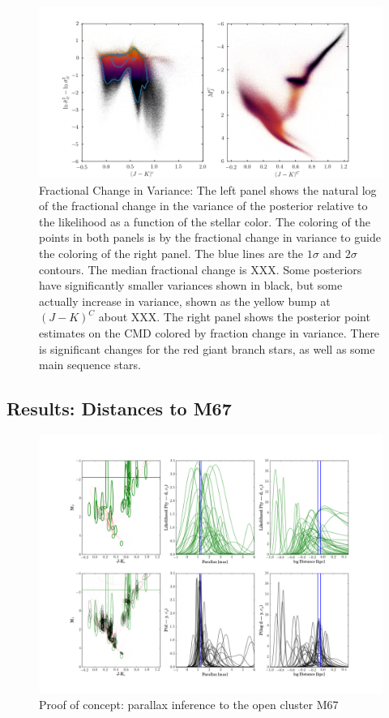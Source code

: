 \documentclass[modern]{aastex61}
\begin{document}
\begin{figure}
\centering
\includegraphics[width=\textwidth]{delta.png}
\caption{Fractional Change in Variance: The left panel shows the natural log of the fractional change in the variance of the posterior relative to the likelihood as a function of the stellar color. The coloring of the points in both panels is by the fractional change in variance to guide the coloring of the right panel. The blue lines are the $1\sigma$ and $2\sigma$ contours. The median fractional change is XXX. Some posteriors have significantly smaller variances shown in black, but some actually increase in variance, shown as the yellow bump at $(J-K)^C$ about XXX. The right panel shows the posterior point estimates on the CMD colored by fraction change in variance. There is significant changes for the red giant branch stars, as well as some main sequence stars.}
\label{fig:delta}
\end{figure}


\subsection{Results: Distances to M67}
\begin{figure}
\centering
  \includegraphics[width=\textwidth]{distancesM67.png}
\caption{Proof of concept: parallax inference to the open cluster M67}
\label{fig:m67}
\end{figure}
\end{document}
